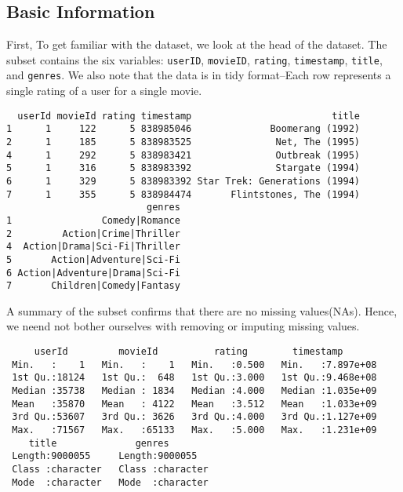 \documentclass[
]{article}
\begin{document}
\hypertarget{basic-information}{%
\subsection{Basic Information}\label{basic-information}}

First, To get familiar with the dataset, we look at the head of the
dataset. The subset contains the six variables: \texttt{userID},
\texttt{movieID}, \texttt{rating}, \texttt{timestamp}, \texttt{title},
and \texttt{genres}. We also note that the data is in tidy format--Each
row represents a single rating of a user for a single movie.

\begin{verbatim}
  userId movieId rating timestamp                         title
1      1     122      5 838985046              Boomerang (1992)
2      1     185      5 838983525               Net, The (1995)
4      1     292      5 838983421               Outbreak (1995)
5      1     316      5 838983392               Stargate (1994)
6      1     329      5 838983392 Star Trek: Generations (1994)
7      1     355      5 838984474       Flintstones, The (1994)
                         genres
1                Comedy|Romance
2         Action|Crime|Thriller
4  Action|Drama|Sci-Fi|Thriller
5       Action|Adventure|Sci-Fi
6 Action|Adventure|Drama|Sci-Fi
7       Children|Comedy|Fantasy
\end{verbatim}

A summary of the subset confirms that there are no missing values(NAs).
Hence, we neend not bother ourselves with removing or imputing missing
values.

\begin{verbatim}
     userId         movieId          rating        timestamp        
 Min.   :    1   Min.   :    1   Min.   :0.500   Min.   :7.897e+08  
 1st Qu.:18124   1st Qu.:  648   1st Qu.:3.000   1st Qu.:9.468e+08  
 Median :35738   Median : 1834   Median :4.000   Median :1.035e+09  
 Mean   :35870   Mean   : 4122   Mean   :3.512   Mean   :1.033e+09  
 3rd Qu.:53607   3rd Qu.: 3626   3rd Qu.:4.000   3rd Qu.:1.127e+09  
 Max.   :71567   Max.   :65133   Max.   :5.000   Max.   :1.231e+09  
    title              genres         
 Length:9000055     Length:9000055    
 Class :character   Class :character  
 Mode  :character   Mode  :character  
                                      
                                      
                                      
\end{verbatim}
\end{document}
